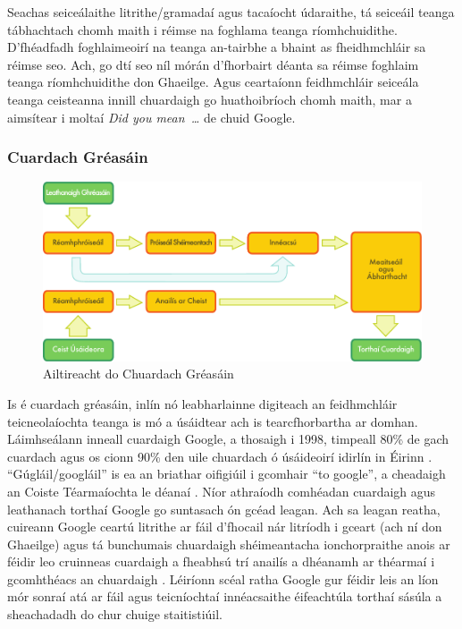 \begin{multicols}{2}

Seachas seiceálaithe litrithe/gramadaí agus tacaíocht údaraithe, tá seiceáil teanga tábhachtach chomh maith i réimse na foghlama teanga ríomhchuidithe. D’fhéadfadh foghlaimeoirí na teanga an-tairbhe a bhaint as fheidhmchláir sa réimse seo. Ach, go dtí seo níl mórán d’fhorbairt déanta sa réimse foghlaim teanga ríomhchuidithe don Ghaeilge. Agus ceartaíonn feidhmchláir seiceála teanga ceisteanna innill chuardaigh go huathoibríoch chomh maith, mar a aimsítear i moltaí \textit{Did you mean~\dots} de chuid Google.

\subsubsection{Cuardach Gréasáin}

\begin{figure}[htb]
  \center
  \includegraphics[width=\textwidth]{../_media/irish/web_search_architecture}
  \caption{Ailtireacht do Chuardach Gréasáin}
  \label{fig:websearcharch_de}
\end{figure}


Is é cuardach gréasáin, inlín nó leabharlainne digiteach an feidhmchláir teicneolaíochta teanga is mó a úsáidtear ach is tearcfhorbartha ar domhan. Láimhseálann inneall cuardaigh Google, a thosaigh i 1998, timpeall 80\% de gach cuardach agus os cionn 90\% den uile chuardach ó úsáideoirí idirlín in Éirinn \cite{googlemarketshare}.  ``Gúgláil/googláil'' is ea an briathar oifigiúil i gcomhair ``to google'', a cheadaigh an Coiste Téarmaíochta le déanaí \cite{kilgarriff2010}.  Níor athraíodh comhéadan cuardaigh agus leathanach torthaí Google go suntasach ón gcéad leagan. Ach sa leagan reatha, cuireann Google ceartú litrithe ar fáil d’fhocail nár litríodh i gceart (ach ní don Ghaeilge) agus tá bunchumais chuardaigh shéimeantacha ionchorpraithe anois ar féidir leo cruinneas cuardaigh a fheabhsú trí anailís a dhéanamh ar théarmaí i gcomhthéacs an chuardaigh \cite{googlesemsearch}. Léiríonn scéal ratha Google gur féidir leis an líon mór sonraí atá ar fáil agus teicníochtaí innéacsaithe éifeachtúla torthaí sásúla a sheachadadh do chur chuige staitistiúil. 



\end{multicols}

